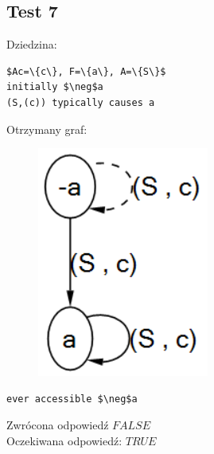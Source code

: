 \documentclass{article}
\begin{document}
\subsection{Test 7}
Dziedzina:
\bigskip
{}
\begin{lstlisting}[mathescape=true]
$Ac=\{c\}, F=\{a\}, A=\{S\}$
initially $\neg$a
(S,(c)) typically causes a
\end{lstlisting}
\vspace{1cm}

Otrzymany graf:
\begin{figure}[H]
	\centering
	\includegraphics[scale=0.6]{test7_graf}
\end{figure}

\begin{lstlisting}[mathescape=true]
ever accessible $\neg$a
\end{lstlisting}
Zwrócona odpowiedź $FALSE$\\
Oczekiwana odpowiedź: $TRUE$


\newpage
\end{document}
